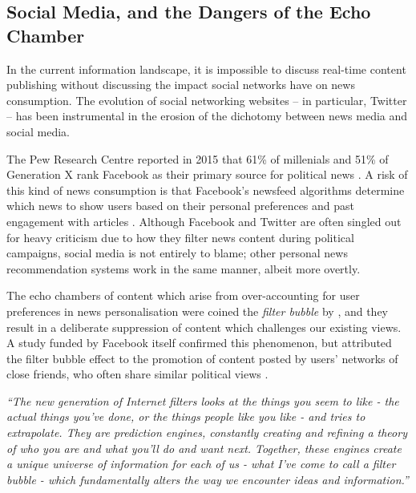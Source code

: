 \subsection{Social Media, and the Dangers of the Echo Chamber}

In the current information landscape, it is impossible to discuss real-time content publishing without discussing the impact social networks have on news consumption. The evolution of social networking websites -- in particular, Twitter -- has been instrumental in the erosion of the dichotomy between news media and social media.

The Pew Research Centre reported in 2015 that 61\% of millenials and 51\% of Generation X rank Facebook as their primary source for political news \citep{Facebook}. A risk of this kind of news consumption is that Facebook's newsfeed algorithms determine which news to show users based on their personal preferences and past engagement with articles \citep{FacebookAlgorithm}. Although Facebook and Twitter are often singled out for heavy criticism due to how they filter news content during political campaigns, social media is not entirely to blame; other personal news recommendation systems work in the same manner, albeit more overtly. 

The echo chambers of content which arise from over-accounting for user preferences in news personalisation were coined the \textit{filter bubble} by \cite{TheFilterBubble}, and they result in a deliberate suppression of content which challenges our existing views. A study funded by Facebook itself confirmed this phenomenon, but attributed the filter bubble effect to the promotion of content posted by users' networks of close friends, who often share similar political views \citep{FacebookExposure}.

\begin{center}
\parbox{\textwidth-3cm}{
\textit{``The new generation of Internet filters looks at the things you seem to like - the actual things you've done, or the things people like you like - and tries to extrapolate. They are prediction engines, constantly creating and refining a theory of who you are and what you'll do and want next. Together, these engines create a unique universe of information for each of us - what I've come to call a filter bubble - which fundamentally alters the way we encounter ideas and information.''} \citep[p.29]{TheFilterBubble}}
\end{center}

